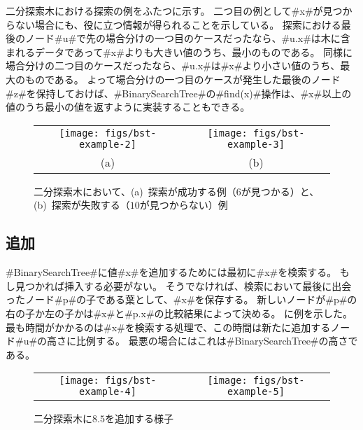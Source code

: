 二分探索木における探索の例をふたつに示す。
二つ目の例として#x#が見つからない場合にも、役に立つ情報が得られることを示している。
探索における最後のノード#u#で先の場合分けの一つ目のケースだったなら、#u.x#は木に含まれるデータであって#x#よりも大きい値のうち、最小のものである。
同様に場合分けの二つ目のケースだったなら、#u.x#は#x#より小さい値のうち、最大のものである。
よって場合分けの一つ目のケースが発生した最後のノード#z#を保持しておけば、#BinarySearchTree#の#find(x)#操作は、#x#以上の値のうち最小の値を返すように実装することもできる。

\begin{figure}
  \begin{center}
    \begin{tabular}{cc}
    \texttt{[image: figs/bst-example-2]} &
    \texttt{[image: figs/bst-example-3]} \\
    (a) & (b)
    \end{tabular}
  \end{center}
  \caption{二分探索木において、(a)~探索が成功する例（$6$が見つかる）と、(b)~探索が失敗する（$10$が見つからない）例}
\end{figure}


\subsection{追加}

#BinarySearchTree#に値#x#を追加するためには最初に#x#を検索する。
もし見つかれば挿入する必要がない。
そうでなければ、検索において最後に出会ったノード#p#の子である葉として、#x#を保存する。
新しいノードが#p#の右の子か左の子かは#x#と#p.x#の比較結果によって決める。
に例を示した。
最も時間がかかるのは#x#を検索する処理で、この時間は新たに追加するノード#u#の高さに比例する。
最悪の場合にはこれは#BinarySearchTree#の高さである。


\begin{figure}
  \begin{center}
    \begin{tabular}{cc}
    \texttt{[image: figs/bst-example-4]} &
    \texttt{[image: figs/bst-example-5]} 
    \end{tabular}
  \end{center}
  \caption{二分探索木に$8.5$を追加する様子}
\end{figure}


